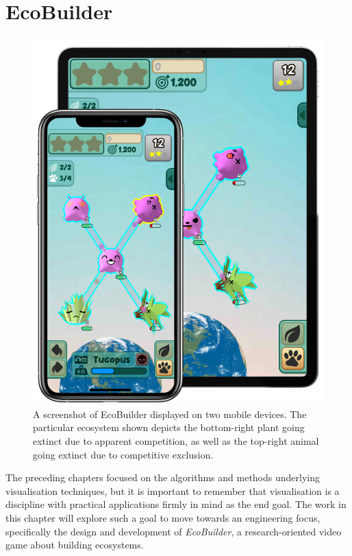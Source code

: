 \chapter{EcoBuilder}
\label{chap:joy}

\begin{figure}
    \centering
    \includegraphics[width=\textwidth]{joy/device.png}
    \caption[A screenshot of EcoBuilder displayed on mobile devices.]{A screenshot of EcoBuilder displayed on two mobile devices. The particular ecosystem shown depicts the bottom-right plant going extinct due to apparent competition, as well as the top-right animal going extinct due to competitive exclusion.}
    \label{fig:ecobuilder_device}
\end{figure}

The preceding chapters focused on the algorithms and methods underlying visualisation techniques, but it is important to remember that visualisation is a discipline with practical applications firmly in mind as the end goal.
The work in this chapter will explore such a goal to move towards an engineering focus, specifically the design and development of \emph{EcoBuilder}, a research-oriented video game about building ecosystems.

